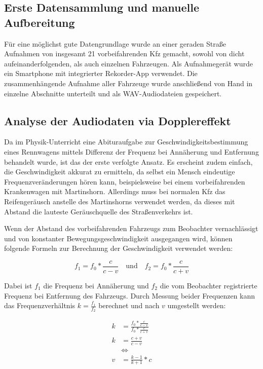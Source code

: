 \subsection{Erste Datensammlung und manuelle Aufbereitung}
Für eine möglichst gute Datengrundlage wurde an einer geraden Straße Aufnahmen von insgesamt 21 vorbeifahrenden Kfz gemacht, sowohl von dicht aufeinanderfolgenden, als auch einzelnen Fahrzeugen. Als Aufnahmegerät wurde ein Smartphone mit integrierter Rekorder-App verwendet. Die zusammenhängende Aufnahme aller Fahrzeuge wurde anschließend von Hand in einzelne Abschnitte unterteilt und als WAV-Audiodateien gespeichert.  %

\subsection{Analyse der Audiodaten via Dopplereffekt}
Da im Phy\-sik-Unter\-richt eine Abituraufgabe zur Geschwindigkeitsbestimmung eines Rennwagens mittels Differenz der Frequenz bei Annäherung und Entfernung behandelt wurde, ist das der erste verfolgte Ansatz. Es erscheint zudem einfach, die Geschwindigkeit akkurat zu ermitteln, da selbst ein Mensch eindeutige Frequenzveränderungen hören kann, beispielsweise bei einem vorbeifahrenden Krankenwagen mit Martinshorn. Allerdings muss bei normalen Kfz das Reifengeräusch anstelle des Martinshorns verwendet werden, da dieses mit Abstand die lauteste Geräuschquelle des Straßenverkehrs ist.

Wenn der Abstand des vorbeifahrenden Fahrzeugs zum Beobachter vernachlässigt und von konstanter Bewegungsgeschwindigkeit ausgegangen wird, können folgende Formeln zur Berechnung der Geschwindigkeit verwendet werden:

\[
    f_{1} = f_{0} * \frac{c}{c - v}
    \quad\text{und}\quad
    f_{2} = f_{0} * \frac{c}{c + v}
\]

Dabei ist \(f_{1}\) die Frequenz bei Annäherung und \(f_{2}\) die vom Beobachter registrierte Frequenz bei Entfernung des Fahrzeugs. Durch Messung beider Frequenzen kann das Frequenzverhältnis \(k = \frac{f_{1}}{f_{2}}\) berechnet und nach \(v\) umgestellt werden:

\begin{equation*}
    \begin{split}
        k & = \frac{f_{0} * \frac{c}{c - v}}{f_{0} * \frac{c}{c + v}} \\
        k & = \frac{c + v}{c - v} \\
        & \Leftrightarrow \\
        v & = \frac{k - 1}{k + 1} * c
    \end{split}
\end{equation*}

